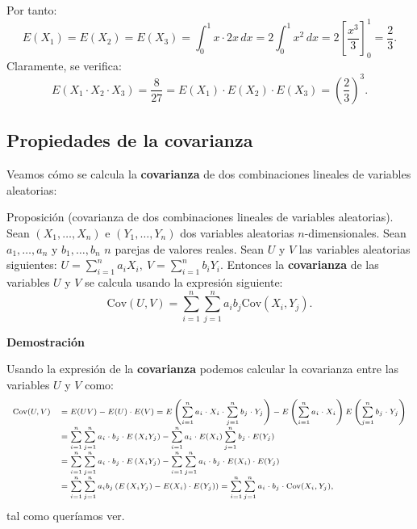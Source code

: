 \documentclass[]{book}
\begin{document}
Por tanto:
\[
E(X_1)=E(X_2)=E(X_3)=\int_0^1 x\cdot 2 x\, dx =2 \int_0^1 x^2\, dx=2\left[\frac{x^3}{3}\right]_0^1=\frac{2}{3}.
\]
Claramente, se verifica:
\[
E(X_1\cdot X_2\cdot X_3)=\frac{8}{27}=E(X_1)\cdot E(X_2)\cdot E(X_3)=\left(\frac{2}{3}\right)^3.
\]

\hypertarget{propiedades-de-la-covarianza-1}{%
\subsection{Propiedades de la covarianza}\label{propiedades-de-la-covarianza-1}}

Veamos cómo se calcula la \textbf{covarianza} de dos combinaciones lineales de variables aleatorias:

Proposición (covarianza de dos combinaciones lineales de variables aleatorias).
Sean \((X_1,\ldots,X_n)\) e \((Y_1,\ldots, Y_n)\) dos variables aleatorias \(n\)-dimensionales. Sean \(a_1, \ldots, a_n\) y \(b_1,\ldots, b_n\) \(n\) parejas de valores reales. Sean \(U\) y \(V\) las variables aleatorias siguientes:
\(U=\sum\limits_{i=1}^n a_i X_i,\  V=\sum\limits_{i=1}^n b_i Y_i.\)
Entonces la \textbf{covarianza} de las variables \(U\) y \(V\) se calcula usando la expresión siguiente:
\[
\mathrm{Cov}(U,V)=\sum_{i=1}^n\sum_{j=1}^n a_i b_j \mathrm{Cov}(X_i,Y_j).
\]

\textbf{Demostración}

Usando la expresión de la \textbf{covarianza} podemos calcular la covarianza entre las variables \(U\) y \(V\) como:
\[
\scriptsize{
\begin{array}{rl}
\mathrm{Cov}(U,V) & =E(UV)-E(U)\cdot E(V)=E\left(\sum\limits_{i=1}^n a_i \cdot X_i\cdot \sum\limits_{j=1}^n b_j \cdot Y_j\right)- E\left(\sum\limits_{i=1}^n a_i \cdot X_i\right)E\left(\sum\limits_{j=1}^n b_j \cdot Y_j\right) \\ & =\sum\limits_{i=1}^n \sum\limits_{j=1}^n a_i\cdot  b_j \cdot E\left(X_i Y_j\right)-\sum\limits_{i=1}^n a_i\cdot  E(X_i)\sum\limits_{j=1}^n b_j \cdot E(Y_j) \\
&= \sum\limits_{i=1}^n \sum\limits_{j=1}^n a_i\cdot  b_j\cdot E\left(X_i Y_j\right)-\sum\limits_{i=1}^n\sum\limits_{j=1}^n a_i\cdot  b_j\cdot  E(X_i)\cdot  E(Y_j) \\ & = \sum\limits_{i=1}^n \sum\limits_{j=1}^n a_i b_j \left(E\left(X_i Y_j\right) - E(X_i)\cdot  E(Y_j)\right) = \sum\limits_{i=1}^n \sum\limits_{j=1}^n a_i\cdot  b_j\cdot  \mathrm{Cov}(X_i,Y_j),
\end{array}}
\]
tal como queríamos ver.
\end{document}
